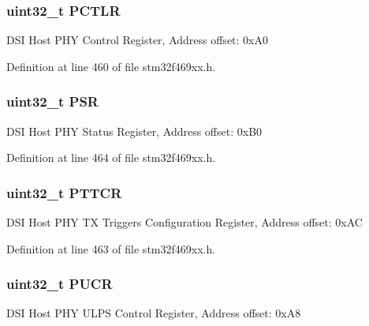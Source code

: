 \subsubsection[{\texorpdfstring{P\+C\+T\+LR}{PCTLR}}]{ uint32\+\_\+t P\+C\+T\+LR}\hypertarget{struct_d_s_i___type_def_a5cb818b16506f04ab31cd6ba46dad854}{}\label{struct_d_s_i___type_def_a5cb818b16506f04ab31cd6ba46dad854}
D\+SI Host P\+HY Control Register, Address offset\+: 0x\+A0 

Definition at line 460 of file stm32f469xx.\+h.

\subsubsection[{\texorpdfstring{P\+SR}{PSR}}]{ uint32\+\_\+t P\+SR}\hypertarget{struct_d_s_i___type_def_a909d70d4d88dd6731a07b76a21c8214b}{}\label{struct_d_s_i___type_def_a909d70d4d88dd6731a07b76a21c8214b}
D\+SI Host P\+HY Status Register, Address offset\+: 0x\+B0 

Definition at line 464 of file stm32f469xx.\+h.

\subsubsection[{\texorpdfstring{P\+T\+T\+CR}{PTTCR}}]{ uint32\+\_\+t P\+T\+T\+CR}\hypertarget{struct_d_s_i___type_def_a3c44fbc278fa4361c9f06ce86cd0236b}{}\label{struct_d_s_i___type_def_a3c44fbc278fa4361c9f06ce86cd0236b}
D\+SI Host P\+HY TX Triggers Configuration Register, Address offset\+: 0x\+AC 

Definition at line 463 of file stm32f469xx.\+h.

\subsubsection[{\texorpdfstring{P\+U\+CR}{PUCR}}]{ uint32\+\_\+t P\+U\+CR}\hypertarget{struct_d_s_i___type_def_a6455dee3c68bd18ad586ebd7e88de1c7}{}\label{struct_d_s_i___type_def_a6455dee3c68bd18ad586ebd7e88de1c7}
D\+SI Host P\+HY U\+L\+PS Control Register, Address offset\+: 0x\+A8 

